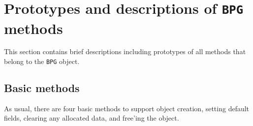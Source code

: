 \par
\section{Prototypes and descriptions of {\tt BPG} methods}
\label{section:BPG:proto}
\par
This section contains brief descriptions including prototypes
of all methods that belong to the {\tt BPG} object.
\par
\subsection{Basic methods}
\label{subsection:BPG:proto:basics}
\par
As usual, there are four basic methods to support object creation,
setting default fields, clearing any allocated data, and free'ing
the object.
\par
